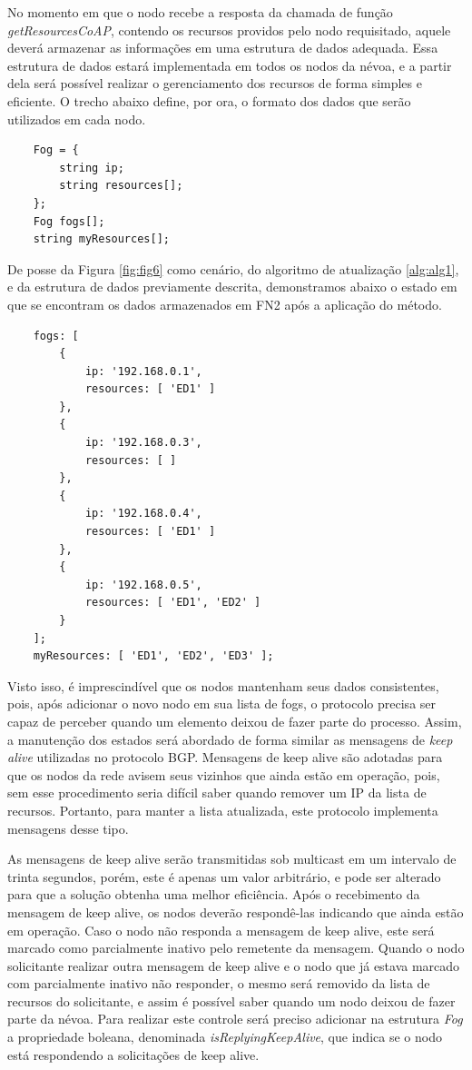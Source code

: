 No momento em que o nodo recebe a resposta da chamada de função \textit{getResourcesCoAP}, contendo os recursos providos pelo nodo requisitado, aquele deverá armazenar as informações em uma estrutura de dados adequada.
Essa estrutura de dados estará implementada em todos os nodos da névoa, e a partir dela será possível realizar o gerenciamento dos recursos de forma simples e eficiente.
O trecho abaixo define, por ora, o formato dos dados que serão utilizados em cada nodo.


\begin{verbatim}
    Fog = {
        string ip;
        string resources[];    
    };
    Fog fogs[];
    string myResources[];
\end{verbatim}

De posse da Figura \ref{fig:fig6} como cenário, do algoritmo de atualização \ref{alg:alg1}, e da estrutura de dados previamente descrita,
demonstramos abaixo o estado em que se encontram os dados armazenados em FN2 após a aplicação do método.

\begin{verbatim}
    fogs: [
        {
            ip: '192.168.0.1',
            resources: [ 'ED1' ]
        },
        {
            ip: '192.168.0.3',
            resources: [ ]
        },
        {
            ip: '192.168.0.4',
            resources: [ 'ED1' ]
        },
        {
            ip: '192.168.0.5',
            resources: [ 'ED1', 'ED2' ]
        }
    ];
    myResources: [ 'ED1', 'ED2', 'ED3' ];
\end{verbatim}

Visto isso, é imprescindível que os nodos mantenham seus dados consistentes, pois, após adicionar o novo nodo em sua lista de fogs, o protocolo precisa ser capaz de perceber quando um elemento
deixou de fazer parte do processo. Assim, a manutenção dos estados será abordado de forma similar as mensagens de \textit{keep alive} utilizadas no protocolo BGP\cite{Rekhter:1995}.
Mensagens de keep alive são adotadas para que os nodos da rede avisem seus vizinhos que ainda estão em operação, pois, sem esse procedimento seria difícil
saber quando remover um IP da lista de recursos. Portanto, para manter a lista atualizada, este protocolo implementa mensagens desse tipo.

As mensagens de keep alive serão transmitidas sob multicast em um intervalo de trinta segundos, porém, este é apenas um valor arbitrário, e pode ser alterado
para que a solução obtenha uma melhor eficiência.
Após o recebimento da mensagem de keep alive, os nodos deverão respondê-las indicando que ainda estão em operação.
Caso o nodo não responda a mensagem de keep alive, este será marcado como parcialmente inativo pelo remetente da mensagem.
Quando o nodo solicitante realizar outra mensagem de keep alive e o nodo que já estava marcado com parcialmente inativo não responder, o mesmo será removido da lista de recursos do
solicitante, e assim é possível saber quando um nodo deixou de fazer parte da névoa.
Para realizar este controle será preciso adicionar na estrutura \textit{Fog} a propriedade boleana, denominada \textit{isReplyingKeepAlive}, que indica se o nodo está respondendo a solicitações de keep alive.

